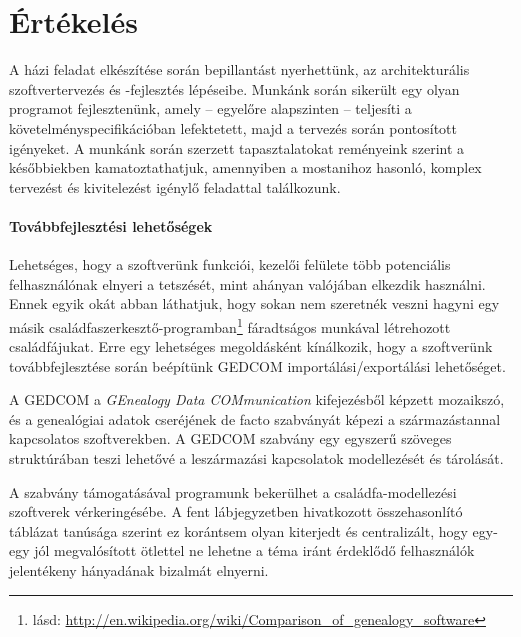 \chapter*{Értékelés}\label{sect:ertekeles}

A házi feladat elkészítése során bepillantást nyerhettünk, az architekturális szoftvertervezés és -fejlesztés lépéseibe. Munkánk során sikerült egy olyan programot fejlesztenünk, amely -- egyelőre alapszinten -- teljesíti a követelményspecifikációban lefektetett, majd a tervezés során pontosított igényeket. A munkánk során szerzett tapasztalatokat reményeink szerint a későbbiekben kamatoztathatjuk, amennyiben a mostanihoz hasonló, komplex tervezést és kivitelezést igénylő feladattal találkozunk.

\subsubsection{Továbbfejlesztési lehetőségek}\label{sect:tovabbfejlesztes}

Lehetséges, hogy a szoftverünk funkciói, kezelői felülete több potenciális felhasználónak elnyeri a tetszését, mint ahányan valójában elkezdik használni. Ennek egyik okát abban láthatjuk, hogy sokan nem szeretnék veszni hagyni egy másik családfaszerkesztő-programban\footnote{lásd: \url{http://en.wikipedia.org/wiki/Comparison_of_genealogy_software}} fáradtságos munkával létrehozott családfájukat. Erre egy lehetséges megoldásként kínálkozik, hogy a szoftverünk továbbfejlesztése során beépítünk GEDCOM importálási/exportálási lehetőséget.

A GEDCOM a \emph{GEnealogy Data COMmunication} kifejezésből képzett mozaikszó, és a genealógiai adatok cseréjének de facto szabványát képezi a származástannal kapcsolatos szoftverekben. A GEDCOM szabvány egy egyszerű szöveges struktúrában teszi lehetővé a leszármazási kapcsolatok modellezését és tárolását.

A szabvány támogatásával programunk bekerülhet a családfa-modellezési szoftverek vérkeringésébe. A fent lábjegyzetben hivatkozott összehasonlító táblázat tanúsága szerint ez korántsem olyan kiterjedt és centralizált, hogy egy-egy jól megvalósított ötlettel ne lehetne a téma iránt érdeklődő felhasználók jelentékeny hányadának bizalmát elnyerni.
